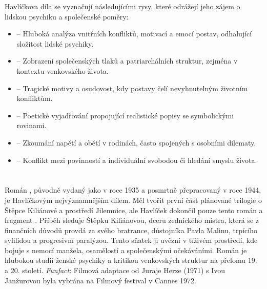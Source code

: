 \documentclass{article}
\newcommand{\mysection}[2]{
	\setlength\fboxsep{4pt} %
	\section*{\colorbox{DP}{\makebox[\dimexpr\textwidth-2\fboxsep\relax]{\color{cyan}#1\hfill#2}}}\vspace{-4pt}
}
\begin{document}
\begin{mdframed}[backgroundcolor=DP,
	linecolor=cyan,
	linewidth=2pt,
	innertopmargin=5pt,
	innerbottommargin=5pt,
	innerleftmargin=5pt,
	innerrightmargin=5pt]\color{white}
\par
Havlíčkova díla se vyznačují následujícími rysy, které odrážejí jeho zájem o lidskou psychiku a společenské poměry:
\begin{itemize}[leftmargin=*]\setlength\itemsep{-4pt}
	\item {} -- Hluboká analýza vnitřních konfliktů, motivací a emocí postav, odhalující složitost lidské psychiky.
	\item {} -- Zobrazení společenských tlaků a patriarchálních struktur, zejména v kontextu venkovského života.
	\item {} -- Tragické motivy a osudovost, kdy postavy čelí nevyhnutelným životním konfliktům.
	\item {} -- Poetické vyjadřování propojující realistické popisy se symbolickými rovinami.
	\item {} -- Zkoumání napětí a obětí v rodinách, často spojených s osobními dilematy.
	\item {} -- Konflikt mezi povinností a individuální svobodou či hledání smyslu života.
\end{itemize}
\end{mdframed}\vspace{-2pt}
\mysection{Petrolejové lampy}{Literární analýza}

\begin{mdframed}[backgroundcolor=DP,
	linecolor=cyan,
	linewidth=2pt,
	innertopmargin=5pt,
	innerbottommargin=5pt,
	innerleftmargin=5pt,
	innerrightmargin=5pt]\color{white}
	\par
Román , původně vydaný jako  v roce 1935 a posmrtně přepracovaný v roce 1944, je Havlíčkovým nejvýznamnějším dílem. Měl tvořit první část plánované trilogie o Štěpce Kiliánové a prostředí Jilemnice, ale Havlíček dokončil pouze tento román a fragment . Příběh sleduje Štěpku Kiliánovou, dceru zednického mistra, která se z finančních důvodů provdá za svého bratrance, důstojníka Pavla Malinu, trpícího syfilidou a progresivní paralýzou. Tento sňatek ji uvězní v tíživém prostředí, kde bojuje s nemocí manžela, osamělostí a společenskými očekáváními. Román je hlubokou studií ženské psychiky a kritikou venkovských struktur na přelomu 19. a 20. století. \textit{Funfact}: Filmová adaptace od Juraje Herze (1971) s Ivou Janžurovou byla vybrána na Filmový festival v Cannes 1972.
\end{mdframed}\vspace{-2pt}
	
\end{document}
